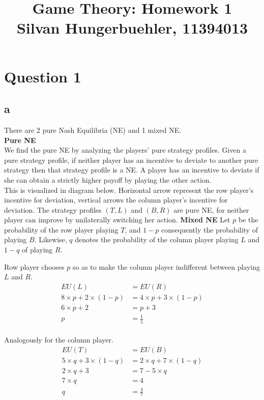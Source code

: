 \documentclass[10pt,a4paper]{article}
\title{%
  Game Theory: Homework 1 \\
  \large Silvan Hungerbuehler, 11394013}
\date{}
\begin{document}
\maketitle

\section*{Question 1}
\subsection*{a}
There are 2 pure Nash Equilibria (NE) and 1 mixed NE.\\
\textbf{Pure NE}\\
We find the pure NE by analyzing the players' pure strategy profiles. Given a pure strategy profile, if neither player has  an incentive to deviate to another pure strategy then that strategy profile is a NE. A player has an incentive to deviate if she can obtain a strictly higher payoff by playing the other action.\\
This is visualized in diagram below. Horizontal arrow represent the row player's incentive for deviation, vertical arrows the column player's incentive for deviation. The strategy profiles $(T,L)$ and $(B,R)$ are pure NE, for neither player can improve by unilaterally switching her action.
\textbf{Mixed NE}
Let $p$ be the probability of the row player playing $T$, and $1-p$ consequently the probability of playing $B$. Likewise, $q$ denotes the probability of the column player  playing $L$ and $1-q$ of playing $R$.

Row player chooses $p$ so as to make the column player indifferent between playing $L$ and $R$.\\
\begin{align*}
EU(L)&=EU(R)\\
8\times p + 2\times (1-p)&= 4\times p + 3\times (1-p) \\
6\times p + 2 &= p+3 \\
p &= \tfrac{1}{5}
\end{align*}\\
Analogously for the column player.\\
\begin{align*}
EU(T)&=EU(B)\\
5\times q + 3\times (1-q)&= 2\times q + 7\times (1-q) \\
2\times q + 3 &= 7-5\times q \\
7\times q &= 4 \\
q &= \tfrac{4}{7}
\end{align*}
\end{document}
